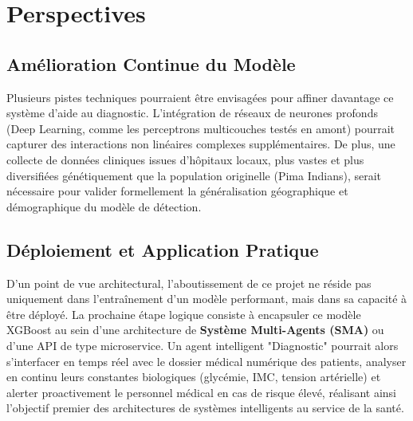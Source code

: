 \begin{table}[htbp]
    \centering
    \caption{Mesure de l'impact des optimisations sur la précision finale du XGBoost}
    \label{tab:evolution_scores}
\end{table}

\section{Perspectives}

\subsection{Amélioration Continue du Modèle}
Plusieurs pistes techniques pourraient être envisagées pour affiner davantage ce système d'aide au diagnostic. L'intégration de réseaux de neurones profonds (Deep Learning, comme les perceptrons multicouches testés en amont) pourrait capturer des interactions non linéaires complexes supplémentaires. De plus, une collecte de données cliniques issues d'hôpitaux locaux, plus vastes et plus diversifiées génétiquement que la population originelle (Pima Indians), serait nécessaire pour valider formellement la généralisation géographique et démographique du modèle de détection.

\subsection{Déploiement et Application Pratique}
D'un point de vue architectural, l'aboutissement de ce projet ne réside pas uniquement dans l'entraînement d'un modèle performant, mais dans sa capacité à être déployé. La prochaine étape logique consiste à encapsuler ce modèle XGBoost au sein d'une architecture de \textbf{Système Multi-Agents (SMA)} ou d'une API de type microservice. Un agent intelligent "Diagnostic" pourrait alors s'interfacer en temps réel avec le dossier médical numérique des patients, analyser en continu leurs constantes biologiques (glycémie, IMC, tension artérielle) et alerter proactivement le personnel médical en cas de risque élevé, réalisant ainsi l'objectif premier des architectures de systèmes intelligents au service de la santé.
